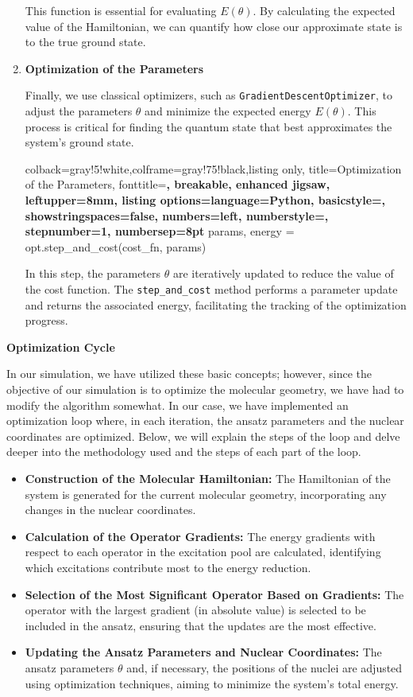 \begin{enumerate}
  This function is essential for evaluating \(E(\theta)\). By calculating the expected value of the Hamiltonian, we can quantify how close our approximate state is to the true ground state.
  
  \item \textbf{Optimization of the Parameters}
  
  Finally, we use classical optimizers, such as \texttt{GradientDescentOptimizer}, to adjust the parameters \(\theta\) and minimize the expected energy \(E(\theta)\). This process is critical for finding the quantum state that best approximates the system's ground state.
  
  \begin{tcblisting}{colback=gray!5!white,colframe=gray!75!black,listing only,
    title=Optimization of the Parameters, fonttitle=\bfseries, breakable, enhanced jigsaw, leftupper=8mm,
    listing options={language=Python, basicstyle=\ttfamily\small,
    showstringspaces=false, numbers=left, numberstyle=\footnotesize, stepnumber=1, numbersep=8pt}}
params, energy = opt.step_and_cost(cost_fn, params)
  \end{tcblisting}
  
  In this step, the parameters \(\theta\) are iteratively updated to reduce the value of the cost function. The \texttt{step\_and\_cost} method performs a parameter update and returns the associated energy, facilitating the tracking of the optimization progress.
\end{enumerate}

\textbf{Optimization Cycle}

In our simulation, we have utilized these basic concepts; however, since the objective of our simulation is to optimize the molecular geometry, we have had to modify the algorithm somewhat. In our case, we have implemented an optimization loop where, in each iteration, the ansatz parameters and the nuclear coordinates are optimized. Below, we will explain the steps of the loop and delve deeper into the methodology used and the steps of each part of the loop.

\begin{itemize}
    \item \textbf{Construction of the Molecular Hamiltonian:} The Hamiltonian of the system is generated for the current molecular geometry, incorporating any changes in the nuclear coordinates.
    \item \textbf{Calculation of the Operator Gradients:} The energy gradients with respect to each operator in the excitation pool are calculated, identifying which excitations contribute most to the energy reduction.
    \item \textbf{Selection of the Most Significant Operator Based on Gradients:} The operator with the largest gradient (in absolute value) is selected to be included in the ansatz, ensuring that the updates are the most effective.
    \item \textbf{Updating the Ansatz Parameters and Nuclear Coordinates:} The ansatz parameters \(\theta\) and, if necessary, the positions of the nuclei are adjusted using optimization techniques, aiming to minimize the system's total energy.
\end{itemize}

